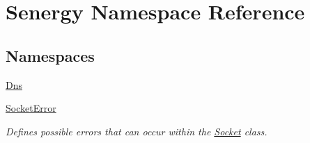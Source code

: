 \hypertarget{namespace_senergy}{\section{Senergy Namespace Reference}
\label{namespace_senergy}
}
\subsection*{Namespaces}
\begin{DoxyCompactItemize}
\item 
\hyperlink{namespace_senergy_1_1_dns}{Dns}
\item 
\hyperlink{namespace_senergy_1_1_socket_error}{Socket\-Error}
\begin{DoxyCompactList}\small\item\em Defines possible errors that can occur within the \hyperlink{class_senergy_1_1_socket}{Socket} class. \end{DoxyCompactList}\end{DoxyCompactItemize}
